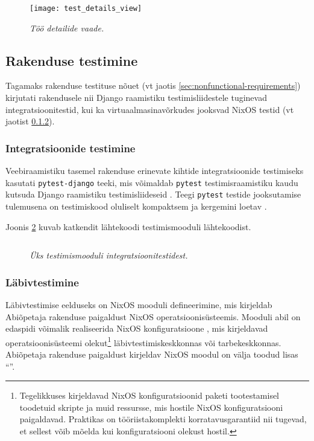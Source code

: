 \begin{figure}[H]
    \centering
    \texttt{[image: test\_details\_view]}
    \caption{\emph{Töö detailide vaade.}}
    \label{fig:test-details-view}
\end{figure}

\subsection{Rakenduse testimine}

Tagamaks rakenduse testituse nõuet (vt jaotis \ref{sec:nonfunctional-requirements}) kirjutati rakendusele nii Django raamistiku testimisliidestele \cite{django-testing-api} tuginevad integratsioonitestid, kui ka virtuaalmasinavõrkudes jooksvad NixOS testid \cite{nixos-tests} (vt jaotist \ref{subsubsec:e2etests}).

\subsubsection{Integratsioonide testimine}

Veebiraamistiku tasemel rakenduse erinevate kihtide integratsioonide testimiseks kasutati \texttt{pytest-django} teeki, mis võimaldab
\texttt{pytest} testimisraamistiku kaudu kutsuda Django raamistiku testimisliideseid \cite{pytest-django-usage}. Teegi \texttt{pytest} testide jooksutamise tulemusena on testimiskood oluliselt kompaktsem ja kergemini loetav \cite{pytest-django-why}.

Joonis \ref{fig:pytest} kuvab katkendit lähtekoodi testimismooduli lähtekoodist.

\begin{figure}
\inputminted[breaklines]{py}{chapters/data/test.py}
\caption{\emph{Üks testimismooduli integratsioonitestidest.}}\label{fig:pytest}
\end{figure}

\subsubsection{Läbivtestimine}\label{subsubsec:e2etests}

\newcommand{\stateActually}{Tegelikkuses kirjeldavad NixOS konfiguratsioonid paketi tootestamisel toodetuid skripte ja muid ressursse, mis hostile NixOS konfiguratsiooni paigaldavad. Praktikas on tööriistakomplekti korratavusgarantiid nii tugevad, et sellest võib mõelda kui konfiguratsiooni olekust hostil.}

Läbivtestimise eelduseks on NixOS mooduli defineerimine, mis kirjeldab Abiõpetaja rakenduse paigaldust NixOS operatsioonisüsteemis. Mooduli abil on edaspidi võimalik realiseerida NixOS konfiguratsioone \cite{nixos-configuration}, mis kirjeldavad operatsioonisüsteemi olekut\footnote{\stateActually} läbivtestimiskeskkonnas või tarbekeskkonnas. Abiõpetaja rakenduse paigaldust kirjeldav NixOS moodul on välja toodud lisas ``''.


